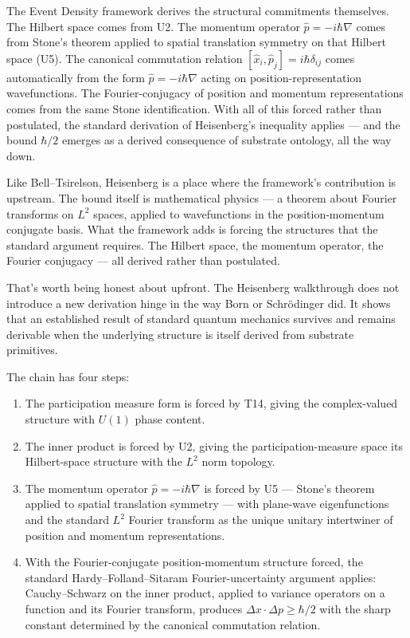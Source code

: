 \documentclass[11pt,a4paper]{article}
\begin{document}
The Event Density framework derives the structural commitments themselves. The Hilbert space comes from U2. The momentum operator $\hat{p} = -i\hbar\nabla$ comes from Stone's theorem applied to spatial translation symmetry on that Hilbert space (U5). The canonical commutation relation $[\hat{x}_i, \hat{p}_j] = i\hbar\delta_{ij}$ comes automatically from the form $\hat{p} = -i\hbar\nabla$ acting on position-representation wavefunctions. The Fourier-conjugacy of position and momentum representations comes from the same Stone identification. With all of this forced rather than postulated, the standard derivation of Heisenberg's inequality applies --- and the bound $\hbar/2$ emerges as a derived consequence of substrate ontology, all the way down.

Like Bell--Tsirelson, Heisenberg is a place where the framework's contribution is upstream. The bound itself is mathematical physics --- a theorem about Fourier transforms on $L^2$ spaces, applied to wavefunctions in the position-momentum conjugate basis. What the framework adds is forcing the structures that the standard argument requires. The Hilbert space, the momentum operator, the Fourier conjugacy --- all derived rather than postulated.

That's worth being honest about upfront. The Heisenberg walkthrough does not introduce a new derivation hinge in the way Born or Schr\"odinger did. It shows that an established result of standard quantum mechanics survives and remains derivable when the underlying structure is itself derived from substrate primitives.

The chain has four steps:

\begin{enumerate}[noitemsep]
  \item The participation measure form is forced by T14, giving the complex-valued structure with $U(1)$ phase content.
  \item The inner product is forced by U2, giving the participation-measure space its Hilbert-space structure with the $L^2$ norm topology.
  \item The momentum operator $\hat{p} = -i\hbar\nabla$ is forced by U5 --- Stone's theorem applied to spatial translation symmetry --- with plane-wave eigenfunctions and the standard $L^2$ Fourier transform as the unique unitary intertwiner of position and momentum representations.
  \item With the Fourier-conjugate position-momentum structure forced, the standard Hardy--Folland--Sitaram Fourier-uncertainty argument applies: Cauchy--Schwarz on the inner product, applied to variance operators on a function and its Fourier transform, produces $\Delta x \cdot \Delta p \geq \hbar/2$ with the sharp constant determined by the canonical commutation relation.
\end{enumerate}
\end{document}
